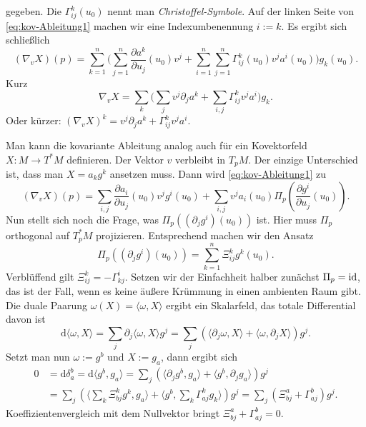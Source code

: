 gegeben. Die $\Gamma_{ij}^k(u_0)$ nennt man \emph{Christoffel-Symbole}.
Auf der linken Seite von \eqref{eq:kov-Ableitung1} machen wir eine
Indexumbenennung $i:=k$. Es ergibt sich schließlich
\begin{equation}
(\nabla_v X)(p)
= \sum_{k=1}^n \bigg(\sum_{j=1}^n \frac{\partial a^k}{\partial u_j}(u_0)v^j
+\sum_{i=1}^n\sum_{j=1}^n \Gamma_{ij}^k(u_0) v^j a^i(u_0)\bigg)g_k(u_0).
\end{equation}
Kurz
\begin{equation}
\nabla_v X = \sum_k \bigg(\sum_j v^j\partial_j a^k
+\sum_{i,j} \Gamma_{ij}^k v^j a^i\bigg)g_k.
\end{equation}
Oder kürzer: $(\nabla_v X)^k = v^j \partial_j a^k + \Gamma_{ij}^k v^j a^i$.

Man kann die kovariante Ableitung analog auch für ein Kovektorfeld
$X\colon M\to T^*M$ definieren. Der Vektor $v$ verbleibt in $T_p M$.
Der einzige Unterschied ist, dass
man $X=a_k g^k$ ansetzen muss. Dann wird \eqref{eq:kov-Ableitung1} zu
\begin{equation}
(\nabla_v X)(p) = \sum_{i,j} \frac{\partial a_i}{\partial u_j}(u_0) v^j g^i(u_0)
+ \sum_{i,j} v^j a_i(u_0) \Pi_p(\frac{\partial g^i}{\partial u_j}(u_0)).
\end{equation}
Nun stellt sich noch die Frage, was
$\Pi_p((\partial_j g^i)(u_0))$
ist. Hier muss $\Pi_p$ orthogonal auf $T_p^* M$ projizieren.
Entsprechend machen wir den Ansatz
\begin{equation}
\Pi_p((\partial_j g^i)(u_0)) = \sum_{k=1}^n \Xi_{ij}^k g^k(u_0).
\end{equation}
Verblüffend gilt $\Xi_{ij}^k = -\Gamma_{kj}^i$. Setzen wir der
Einfachheit halber zunächst $\Pi_p=\operatorname{id}$, das ist der Fall, wenn
es keine äußere Krümmung in einen ambienten Raum gibt. Die duale
Paarung $\omega(X)=\langle\omega,X\rangle$ ergibt ein Skalarfeld,
das totale Differential davon ist
\begin{equation}
\mathrm d\langle\omega,X\rangle = \sum_j\partial_j\langle\omega,X\rangle g^j
= \sum_j (\langle\partial_j\omega,X\rangle+\langle\omega,\partial_j X\rangle)g^j.
\end{equation}
Setzt man nun $\omega:=g^b$ und $X:=g_a$, dann ergibt sich
\begin{align}
0 &= \mathrm d\delta_a^b = \mathrm d\langle g^b,g_a\rangle
= \sum_j (\langle\partial_j g^b,g_a\rangle+\langle g^b,\partial_j g_a\rangle)g^j\\
&= \sum_j (\langle{\textstyle\sum_k}\Xi_{bj}^k g^k,g_a\rangle
  +\langle g^b,{\textstyle\sum_k}\Gamma_{aj}^k g_k\rangle)g^j
= \sum_j (\Xi_{bj}^a+\Gamma_{aj}^b)g^j.
\end{align}
Koeffizientenvergleich mit dem Nullvektor bringt
$\Xi_{bj}^a+\Gamma_{aj}^b=0$.

